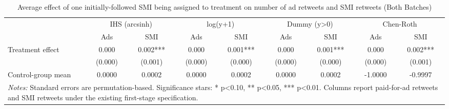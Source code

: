 \begin{table}[!htbp]
\centering
\caption{Average effect of one initially-followed SMI being assigned to treatment on number of ad retweets and SMI retweets (Both Batches)}
\begin{tabular}{lcccccccc}
\hline
 & \multicolumn{2}{c}{IHS (arcsinh)} & \multicolumn{2}{c}{log(y+1)} & \multicolumn{2}{c}{Dummy (y>0)} & \multicolumn{2}{c}{Chen-Roth} \\
 & Ads & SMI & Ads & SMI & Ads & SMI & Ads & SMI \\
\hline
Treatment effect & 0.000 & 0.002*** & 0.000 & 0.001*** & 0.000 & 0.001*** & 0.000 & 0.002*** \\
 & (0.000) & (0.001) & (0.000) & (0.000) & (0.000) & (0.000) & (0.000) & (0.001) \\
Control-group mean & 0.0000 & 0.0002 & 0.0000 & 0.0002 & 0.0000 & 0.0002 & -1.0000 & -0.9997 \\
\hline
\multicolumn{9}{l}{\parbox[t]{15.5cm}{\textit{Notes:} Standard errors are permutation-based. Significance stars: * p<0.10, ** p<0.05, *** p<0.01. Columns report paid-for-ad retweets and SMI retweets under the existing first-stage specification.}} \\
\end{tabular}
\end{table}

